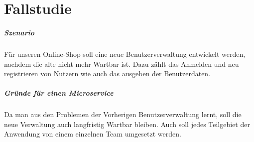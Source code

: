 \chapter{Fallstudie}
\paragraph{Szenario}
Für unseren Online-Shop soll eine neue Benutzerverwaltung entwickelt werden, nachdem die alte nicht mehr Wartbar ist. Dazu zählt das Anmelden und neu registrieren von Nutzern wie auch das ausgeben der Benutzerdaten.

\paragraph{Gründe für einen Microservice}
Da man aus den Problemen der Vorherigen Benutzerverwaltung lernt, soll die neue Verwaltung auch langfristig Wartbar bleiben. \newline
Auch soll jedes Teilgebiet der Anwendung von einem einzelnen Team umgesetzt werden.